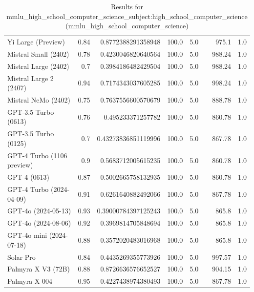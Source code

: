 \begin{table}[htp]
{\begin{tabular}{lrrrrrrr}
Yi Large (Preview) & 0.84 & 0.8772388291358948 & 100.0 & 5.0 &  & 975.1 & 1.0 \\
Mistral Small (2402) & 0.78 & 0.4230046820640564 & 100.0 & 5.0 &  & 988.24 & 1.0 \\
Mistral Large (2402) & 0.7 & 0.3984186482429504 & 100.0 & 5.0 &  & 988.24 & 1.0 \\
Mistral Large 2 (2407) & 0.94 & 0.7174343037605285 & 100.0 & 5.0 &  & 998.24 & 1.0 \\
Mistral NeMo (2402) & 0.75 & 0.7637556600570679 & 100.0 & 5.0 &  & 888.78 & 1.0 \\
GPT-3.5 Turbo (0613) & 0.76 & 0.495233371257782 & 100.0 & 5.0 &  & 860.78 & 1.0 \\
GPT-3.5 Turbo (0125) & 0.7 & 0.43273836851119996 & 100.0 & 5.0 &  & 867.78 & 1.0 \\
GPT-4 Turbo (1106 preview) & 0.9 & 0.5683712005615235 & 100.0 & 5.0 &  & 860.78 & 1.0 \\
GPT-4 (0613) & 0.87 & 0.5002665758132935 & 100.0 & 5.0 &  & 860.78 & 1.0 \\
GPT-4 Turbo (2024-04-09) & 0.91 & 0.6261640882492066 & 100.0 & 5.0 &  & 867.78 & 1.0 \\
GPT-4o (2024-05-13) & 0.93 & 0.39000784397125243 & 100.0 & 5.0 &  & 865.8 & 1.0 \\
GPT-4o (2024-08-06) & 0.92 & 0.3969814705848694 & 100.0 & 5.0 &  & 865.8 & 1.0 \\
GPT-4o mini (2024-07-18) & 0.88 & 0.3572020483016968 & 100.0 & 5.0 &  & 865.8 & 1.0 \\
Solar Pro & 0.84 & 0.4435269355773926 & 100.0 & 5.0 &  & 997.57 & 1.0 \\
Palmyra X V3 (72B) & 0.88 & 0.8726636576652527 & 100.0 & 5.0 &  & 904.15 & 1.0 \\
Palmyra-X-004 & 0.95 & 0.4227438974380493 & 100.0 & 5.0 &  & 867.78 & 1.0 \\
\bottomrule
\end{tabular}}
\caption{Results for mmlu_high_school_computer_science_subject:high_school_computer_science (mmlu_high_school_computer_science)}
\label{fig:mmlu_high_school_computer_science_subject:high_school_computer_science (mmlu_high_school_computer_science)}
\end{table}